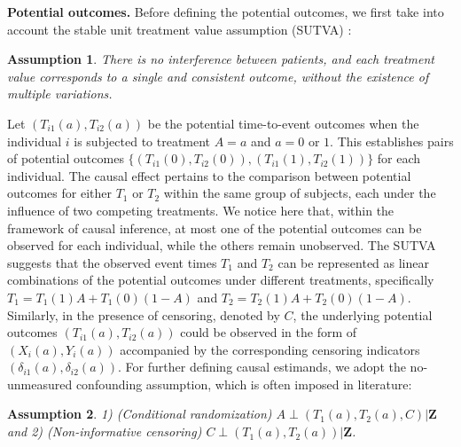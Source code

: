 \documentclass[useAMS,usenatbib,referee]{biom}
\theoremstyle{plain}
\newtheorem{assum}{Assumption}
\def\red #1{{\color{red}{#1}}}
\def\bfZ{\mathbf{Z}}
\begin{document}
\textbf{Potential outcomes.} Before defining the potential outcomes, we first take into account the stable unit treatment value assumption (SUTVA) \citep{rubin1990comment}:
\begin{assum}
There is no interference between patients, and each treatment value corresponds to a single and consistent outcome, without the existence of multiple variations.
\label{assum:sutva}
\end{assum} 
Let $(T_{i1}(a),T_{i2}(a))$ be the potential time-to-event outcomes when the individual $i$ is subjected to treatment $A=a$ and $a=0$ or $1$. This establishes pairs of potential outcomes  $\{(T_{i1}(0),T_{i2}(0)),(T_{i1}(1),T_{i2}(1))\}$ for each individual. 
The causal effect pertains to the comparison between potential outcomes for either $T_1$ or $T_2$ within the same group of subjects, each under the influence of two competing treatments. We notice here that, within the framework of causal inference, at most one of the potential outcomes can be observed for each individual, while the others remain unobserved.  The SUTVA suggests that the observed event times $T_1$ and $T_2$ can be represented as linear combinations of the potential outcomes under different treatments, specifically $T_1=T_1(1)A+T_1(0)(1-A)$ and $T_2 = T_2(1)A+T_2(0)(1-A)$. 
Similarly, in the presence of censoring, denoted by $C$, the underlying potential outcomes $(T_{i1}(a),T_{i2}(a))$ could be observed in the form of $(X_{i}(a),Y_{i}(a))$ accompanied by the corresponding censoring indicators $(\delta_{i1}(a),\delta_{i2}(a))$. 
For further defining causal estimands, we adopt the no-unmeasured confounding assumption, which is often imposed in literature: 
\begin{assum} 
1) (Conditional randomization) $A\perp (T_1(a), T_2(a), C)|\bfZ$
and 2) (Non-informative censoring)  $C\perp (T_1(a), T_2(a))|\bfZ$.
\label{assum:random}
\end{assum}
\red{ non-informative censoring assumption }
\cite{robins2000correcting}
\end{document}
